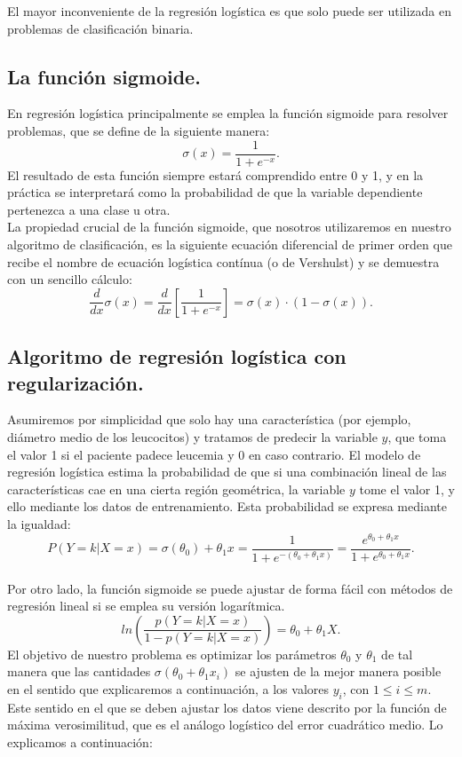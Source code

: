 \documentclass[a4paper,11pt]{article}
\begin{document}
\noindent
El mayor inconveniente de la regresión logística es que solo puede ser utilizada en problemas de clasificación binaria.

\subsection{La función sigmoide.}
En regresión logística principalmente se emplea la función sigmoide para resolver problemas, que se define de la siguiente manera: 
\begin{equation}
\sigma(x)=\frac{1}{1+e^{-x}}.
\end{equation}
El resultado de esta función siempre estará comprendido entre 0 y 1, y en la práctica se interpretará como la probabilidad de que la variable dependiente pertenezca a una clase u otra.\\

\noindent
La propiedad crucial de la función sigmoide, que nosotros utilizaremos en nuestro algoritmo de clasificación, es la siguiente ecuación diferencial de primer
orden que recibe el nombre de ecuación logística contínua (o de Vershulst) y se demuestra con un sencillo cálculo:
\begin{equation}
\frac{d}{dx}\sigma(x)=\frac{d}{dx}\left[\frac{1}{1+e^{-x}}\right]=\sigma(x)\cdot(1-\sigma(x)).
\end{equation}

\subsection{Algoritmo de regresión logística con regularización.}

Asumiremos por simplicidad que solo hay una característica (por ejemplo,
diámetro medio de los leucocitos) y tratamos de predecir la variable $y$, que
toma el valor 1 si el paciente padece leucemia y 0 en caso contrario. El modelo
de regresión logística estima la probabilidad de que si una combinación lineal de
las características cae en una cierta región geométrica, la variable $y$ tome el
valor 1, y ello mediante los datos de entrenamiento. Esta probabilidad se expresa
mediante la igualdad:
\begin{equation}
P(Y=k|X=x)=\sigma(\theta_0)+\theta_1 x=\frac{1}{1+e^{-(\theta_0+\theta_1 x)}}=\frac{e^{\theta_0+\theta_1 x}}{1+e^{\theta_0+\theta_1 x}}.
\end{equation}
\\
Por otro lado, la función sigmoide se puede ajustar de forma fácil con
métodos de regresión lineal si se emplea su versión logarítmica.
\begin{equation}
ln\left( \frac{p(Y=k|X=x)}{1-p(Y=k|X=x)}\right)=\theta_0 + \theta_1 X .
\end{equation}
El objetivo de nuestro problema es optimizar los parámetros $\theta_0$ y $\theta_1$ de tal
manera que las cantidades $\sigma (\theta_0 + \theta_1 x_{i})$ se ajusten de la mejor manera posible en el sentido que explicaremos a continuación, a los valores $y_i$, con $1 \leq i \leq m$.
Este sentido en el que se deben ajustar los datos viene descrito por la función de
máxima verosimilitud, que es el análogo logístico del error cuadrático medio. Lo explicamos a continuación:\\
\end{document}
